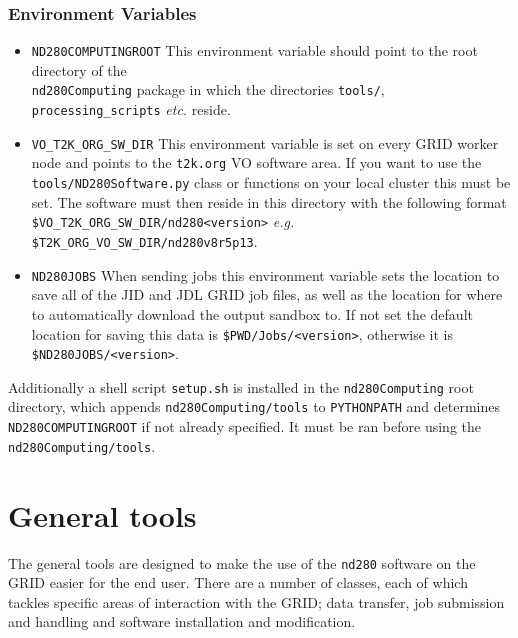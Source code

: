 \documentclass[11pt]{article}
\begin{document}
\subsubsection*{Environment Variables}
 \begin{itemize}
\item \verb+ND280COMPUTINGROOT+
This environment variable should point to the root directory of the\\
\verb+nd280Computing+ package in which the directories \verb+tools/+,
\verb+processing_scripts+ \textit{etc.} reside. 
 
\item \verb+VO_T2K_ORG_SW_DIR+
This environment variable is set on every GRID worker node and points to the \verb+t2k.org+ VO software area. If you want to use the \verb+tools/ND280Software.py+ class or functions on your local cluster this must be set. The software must then reside in this directory with the following format \verb+$VO_T2K_ORG_SW_DIR/nd280<version>+ \textit{e.g.} \verb+$T2K_ORG_VO_SW_DIR/nd280v8r5p13+.
 
\item \verb+ND280JOBS+
When sending jobs this environment variable sets the location to save
all of the JID and JDL GRID job files, as well as the location for
where to automatically download the output sandbox to. If not set the
default location for saving this data is \verb+$PWD/Jobs/<version>+,
otherwise it is \verb+$ND280JOBS/<version>+.
\end{itemize}

Additionally a shell script \verb+setup.sh+ is installed in the
\verb+nd280Computing+ root directory, which appends
\verb+nd280Computing/tools+ to \verb+PYTHONPATH+ and determines
\verb+ND280COMPUTINGROOT+ if not already specified. It must be ran
before using the \verb+nd280Computing/tools+.

\clearpage
\section{General tools}
\label{sec:general}

The general tools are designed to make the use of the \verb+nd280+ software
on the GRID easier for the end user. There are a number of classes,
each of which tackles specific areas of interaction with the GRID;
data transfer, job submission and handling and software installation
and modification.
\end{document}
